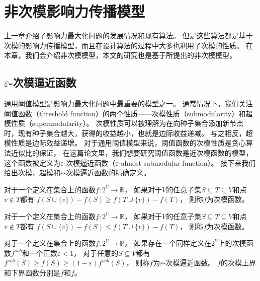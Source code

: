 
\chapter{非次模影响力传播模型}
上一章介绍了影响力最大化问题的发展情况和现有算法。
但是这些算法都是基于次模的影响力传播模型，而且在设计算法的过程中大多也利用了次模的性质。
在本章，我们会介绍非次模模型，本文的研究也是基于所提出的非次模模型。

\section{$\varepsilon$-次模逼近函数}
通用阈值模型是影响力最大化问题中最重要的模型之一。
通常情况下，我们关注阈值函数（threshold function）的两个性质——次模性质（submodularity）和超模性质（supermodularity）。
次模性质可以被理解为在向种子集合添加新节点时，现有种子集合越大，获得的收益越小，也就是边际收益递减。
与之相反，超模性质是边际效益递增。
对于通用阈值模型来说，阈值函数的次模性质是贪心算法近似比的保证\cite{Mossel2007sub}，
在这篇论文里，我们想要研究阈值函数是近次模函数的模型，这个函数被定义为$\varepsilon$-次模逼近函数（$\varepsilon$-almost submodular function）。
接下来我们给出次模，超模和$\varepsilon$-次模逼近函数的精确定义。

\begin{definition}[次模 (Submodular)]
对于一个定义在集合上的函数$f:2^V \to \mathbb{R}$，
如果对于$V$的任意子集$S \subseteq T \subseteq V$和点$v \not\in T$都有
$f(S \cup \{v\}) - f(S) \geq f(T \cup \{v\}) - f(T)$，
则称$f$为次模函数。
\end{definition}

\begin{definition}[超模 (Supermodular)]
对于一个定义在集合上的函数$f:2^V \to \mathbb{R}$，
如果对于$V$的任意子集$S \subseteq T \subseteq V$和点$v \not\in T$都有
$f(S \cup \{v\}) - f(S) \leq f(T \cup \{v\}) - f(T)$，
则称$f$为次模函数。
\end{definition}

\begin{definition}
\label{def:eas}
对于一个定义在集合上的函数$f:2^V \to \mathbb{R}$，
如果存在一个同样定义在$2^V$上的次模函数$f^{sub}$和一个正数$\varepsilon<1$，
对于任意的$S \subseteq V$都有$f^{sub}(S) \geq f(S) \geq (1-\varepsilon)f^{sub}(S)$，
则称$f$为$\varepsilon$-次模逼近函数。
$f$的次模上界和下界函数分别是$\overline{f}$和$\underline{f}$。
\end{definition}

